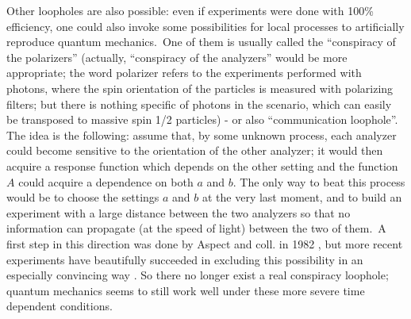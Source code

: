 \documentclass[12pt,onecolumn]{article}%
\begin{document}
Other loopholes are also possible: even if experiments were done with 100\%
efficiency, one could also invoke some possibilities for local processes to
artificially reproduce quantum mechanics.\ One of them is usually called the
``conspiracy of the polarizers'' (actually, ``conspiracy of the analyzers''
would be more appropriate; the word polarizer refers to the experiments
performed with photons, where the spin orientation of the particles is
measured with polarizing filters; but there is nothing specific of photons in
the scenario, which can easily be transposed to massive spin 1/2 particles) -
or also ``communication loophole''. The idea is the following: assume that, by
some unknown process, each analyzer could become sensitive to the orientation
of the other analyzer; it would then acquire a response function which depends
on the other setting and the function $A$ could acquire a dependence on both
$a$ and $b$. The only way to beat this process would be to choose the settings
$a$ and $b$ at the very last moment, and to build an experiment with a large
distance between the two analyzers so that no information can propagate (at
the speed of light) between the two of them.\ A first step in this direction
was done by Aspect and coll. in 1982 \cite{Aspect-temps}, but more recent
experiments have beautifully succeeded in excluding this possibility in an
especially convincing way \cite{Zeilinger-temps}. So there no longer exist a
real conspiracy loophole; quantum mechanics seems to still work well under
these more severe time dependent conditions.
\end{document}
